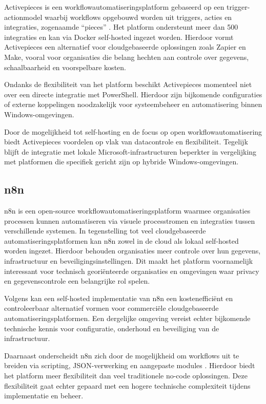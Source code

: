 Activepieces is een workflowautomatiseringsplatform gebaseerd op een trigger-actionmodel waarbij workflows opgebouwd worden uit triggers, acties en integraties, zogenaamde ``pieces'' \autocite{Ulili2025}. Het platform ondersteunt meer dan 500 integraties en kan via Docker self-hosted ingezet worden. Hierdoor vormt Activepieces een alternatief voor cloudgebaseerde oplossingen zoals Zapier en Make, vooral voor organisaties die belang hechten aan controle over gegevens, schaalbaarheid en voorspelbare kosten.

Ondanks de flexibiliteit van het platform beschikt Activepieces momenteel niet over een directe integratie met PowerShell. Hierdoor zijn bijkomende configuraties of externe koppelingen noodzakelijk voor systeembeheer en automatisering binnen Windows-omgevingen.

Door de mogelijkheid tot self-hosting en de focus op open workflowautomatisering biedt Activepieces voordelen op vlak van datacontrole en flexibiliteit. Tegelijk blijft de integratie met lokale Microsoft-infrastructuren beperkter in vergelijking met platformen die specifiek gericht zijn op hybride Windows-omgevingen.

\subsection{n8n}

n8n is een open-source workflowautomatiseringsplatform waarmee organisaties processen kunnen automatiseren via visuele processtromen en integraties tussen verschillende systemen. In tegenstelling tot veel cloudgebaseerde automatiseringsplatformen kan n8n zowel in de cloud als lokaal self-hosted worden ingezet. Hierdoor behouden organisaties meer controle over hun gegevens, infrastructuur en beveiligingsinstellingen. Dit maakt het platform voornamelijk interessant voor technisch georiënteerde organisaties en omgevingen waar privacy en gegevenscontrole een belangrijke rol spelen.

Volgens \textcite{Nakavisute2025} kan een self-hosted implementatie van n8n een kostenefficiënt en controleerbaar alternatief vormen voor commerciële cloudgebaseerde automatiseringsplatformen. Een dergelijke omgeving vereist echter bijkomende technische kennis voor configuratie, onderhoud en beveiliging van de infrastructuur.

Daarnaast onderscheidt n8n zich door de mogelijkheid om workflows uit te breiden via scripting, JSON-verwerking en aangepaste modules \autocite{Nwibe2026}. Hierdoor biedt het platform meer flexibiliteit dan veel traditionele no-code oplossingen. Deze flexibiliteit gaat echter gepaard met een hogere technische complexiteit tijdens implementatie en beheer.

